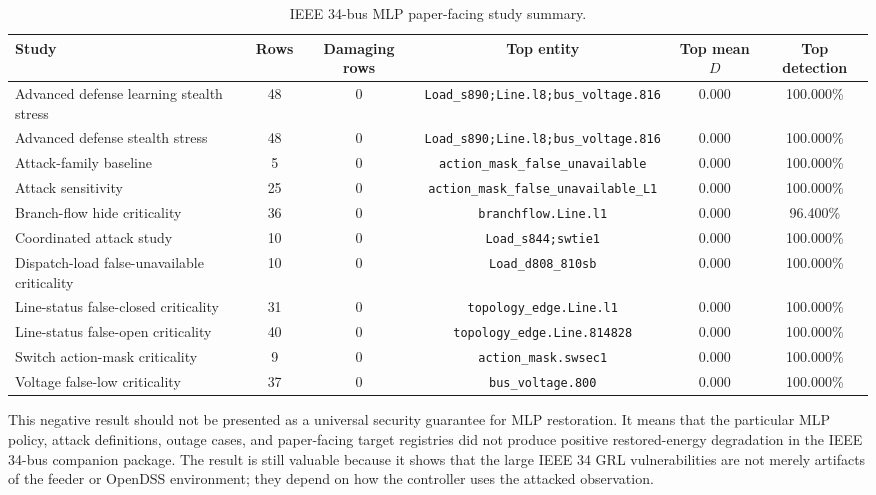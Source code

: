 \begin{table}[t]
\centering
\caption{IEEE 34-bus MLP paper-facing study summary.}
\label{tab:ieee34_mlp_study_summary}
\scriptsize
\begin{tabular}{lccccc}
\hline
Study & Rows & Damaging rows & Top entity & Top mean $D$ & Top detection \\
\hline
Advanced defense learning stealth stress & 48 & 0 & \texttt{Load\_s890;Line.l8;bus\_voltage.816} & 0.000 & 100.000\% \\
Advanced defense stealth stress & 48 & 0 & \texttt{Load\_s890;Line.l8;bus\_voltage.816} & 0.000 & 100.000\% \\
Attack-family baseline & 5 & 0 & \texttt{action\_mask\_false\_unavailable} & 0.000 & 100.000\% \\
Attack sensitivity & 25 & 0 & \texttt{action\_mask\_false\_unavailable\_L1} & 0.000 & 100.000\% \\
Branch-flow hide criticality & 36 & 0 & \texttt{branchflow.Line.l1} & 0.000 & 96.400\% \\
Coordinated attack study & 10 & 0 & \texttt{Load\_s844;swtie1} & 0.000 & 100.000\% \\
Dispatch-load false-unavailable criticality & 10 & 0 & \texttt{Load\_d808\_810sb} & 0.000 & 100.000\% \\
Line-status false-closed criticality & 31 & 0 & \texttt{topology\_edge.Line.l1} & 0.000 & 100.000\% \\
Line-status false-open criticality & 40 & 0 & \texttt{topology\_edge.Line.814828} & 0.000 & 100.000\% \\
Switch action-mask criticality & 9 & 0 & \texttt{action\_mask.swsec1} & 0.000 & 100.000\% \\
Voltage false-low criticality & 37 & 0 & \texttt{bus\_voltage.800} & 0.000 & 100.000\% \\
\hline
\end{tabular}
\end{table}

This negative result should not be presented as a universal security guarantee for MLP restoration. It means that the particular MLP policy, attack definitions, outage cases, and paper-facing target registries did not produce positive restored-energy degradation in the IEEE 34-bus companion package. The result is still valuable because it shows that the large IEEE 34 GRL vulnerabilities are not merely artifacts of the feeder or OpenDSS environment; they depend on how the controller uses the attacked observation.

